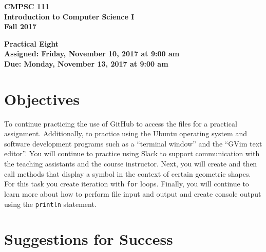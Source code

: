 \documentclass[11pt]{article}
\newcommand{\assignmentduedate}{November 13}
\newcommand{\assignmentassignedate}{November 10}
\newcommand{\assignmentnumber}{Eight}
\newcommand{\labyear}{2017}
\newcommand{\labdueday}{Monday}
\newcommand{\labassignday}{Friday}
\newcommand{\labtime}{9:00 am}
\newcommand{\assigneddate}{Assigned: \labassignday, \assignmentassignedate, \labyear{} at \labtime{}}
\newcommand{\duedate}{Due: \labdueday, \assignmentduedate, \labyear{} at \labtime{}}
\newcommand{\labtitle}[1]
{
  \begin{center}
    \begin{center}
      \bf
      CMPSC 111\\Introduction to Computer Science I\\
      Fall 2017\\
      \medskip
    \end{center}
    \bf
    #1
  \end{center}
}
\begin{document}
\thispagestyle{empty}

\labtitle{Practical \assignmentnumber{} \\ \assigneddate{} \\ \duedate{}}

\section*{Objectives}

To continue practicing the use of GitHub to access the files for a practical assignment. Additionally, to practice using
the Ubuntu operating system and software development programs such as a ``terminal window'' and the ``GVim text
editor''. You will continue to practice using Slack to support communication with the teaching assistants and the course
instructor. Next, you will create and then call methods that display a symbol in the context of certain geometric
shapes. For this task you create iteration with {\tt for} loops. Finally, you will continue to learn more about how to
perform file input and output and create console output using the {\tt println} statement.

\section*{Suggestions for Success}
\end{document}
